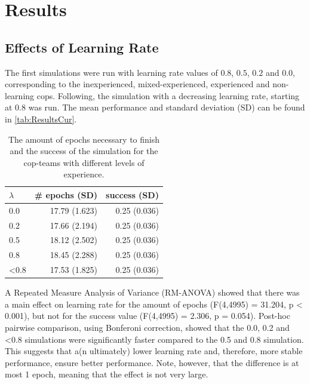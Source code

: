 \section{Results}
\subsection{Effects of Learning Rate}
The first simulations were run with learning rate values of $0.8$, $0.5$, $0.2$ and $0.0$, corresponding to the inexperienced, mixed-experienced, experienced and non-learning cops. Following, the simulation with a decreasing learning rate, starting at $0.8$ was run. The mean performance and standard deviation (SD) can be found in \autoref{tab:ResultsCur}. 

\begin{table}[!ht]
\begin{center}
\begin{tabular}{l r  r}
$\lambda$ &  \# epochs (SD) & success (SD)\\
\hline
0.0 & 17.79 (1.623) & 0.25 (0.036) \\
0.2 & 17.66 (2.194) & 0.25 (0.036) \\
0.5 & 18.12 (2.502) & 0.25 (0.036) \\
0.8 & 18.45 (2.288) & 0.25 (0.036) \\
<0.8 & 17.53 (1.825) & 0.25 (0.036) \\
\hline
\end{tabular}
\caption{The amount of epochs necessary to finish and the success of the simulation for the cop-teams with different levels of experience. }
\label{tab:ResultsCur}
\end{center}
\end{table}
A Repeated Measure Analysis of Variance (RM-ANOVA) showed that there was a main effect on learning rate for the amount of epochs (F(4,4995) = 31.204, p < 0.001), but not for the success value (F(4,4995) = 2.306, p = 0.054). Post-hoc pairwise comparison, using Bonferoni correction, showed that the 0.0, 0.2 and <0.8 simulations were significantly faster compared to the 0.5 and 0.8 simulation. This suggests that a(n ultimately) lower learning rate and, therefore, more stable performance, ensure better performance. Note, however, that the difference is at most 1 epoch, meaning that the effect is not very large. 

